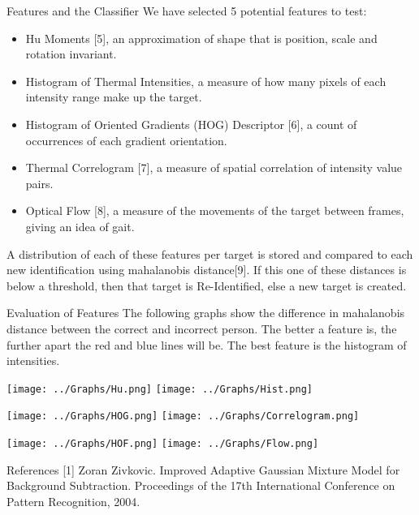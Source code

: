 \documentclass[final]{beamer}
\begin{document}
\begin{frame}{}
\begin{columns}[t]
\begin{column}{.49\linewidth}
        \begin{block}{Features and the Classifier}
        We have selected 5 potential features to test:
          \begin{itemize}
          \item Hu Moments [5], an approximation of shape that is position, scale and rotation invariant.
          \item Histogram of Thermal Intensities, a measure of how many pixels of each intensity range make up the target.
          \item Histogram of Oriented Gradients (HOG) Descriptor [6], a count of  occurrences of each gradient orientation. 
          \item Thermal Correlogram [7], a measure of spatial correlation of intensity value pairs.
          \item Optical Flow [8], a measure of the movements of the target between frames, giving an idea of gait. 
          \end{itemize}
          \justify
          A distribution of each of these features per target is stored and compared to each new identification using mahalanobis distance[9]. If this one of these distances is below a threshold, then that target is Re-Identified, else a new target is created.
        \end{block}
	
        \begin{block}{Evaluation of Features}
        The following graphs show the difference in mahalanobis distance between the correct and incorrect person. The better a feature is, the further apart the red and blue lines will be. The best feature is the histogram of intensities. 
        
		\texttt{[image: ../Graphs/Hu.png]}
		\hspace{2cm}
		\texttt{[image: ../Graphs/Hist.png]}
		
		\texttt{[image: ../Graphs/HOG.png]}
		\hspace{2cm}
		\texttt{[image: ../Graphs/Correlogram.png]}
		
		\texttt{[image: ../Graphs/HOF.png]}
		\hspace{2cm}
		\texttt{[image: ../Graphs/Flow.png]}
		
        \end{block}
        
            \begin{block}{References}
    \scriptsize
[1] Zoran Zivkovic. Improved Adaptive Gaussian Mixture Model for Background Subtraction. Proceedings of the 17th International Conference on Pattern Recognition, 2004.
    

\end{block}
\end{column}
\end{columns}
\end{frame}
\end{document}
